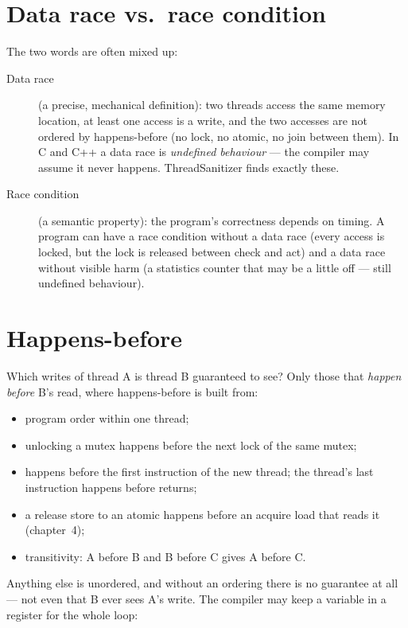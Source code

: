 \section{Data race vs.\ race condition}

The two words are often mixed up:

\begin{description}
  \item[Data race] (a precise, mechanical definition): two threads access
    the same memory location, at least one access is a write, and the two
    accesses are not ordered by happens-before (no lock, no atomic, no
    join between them). In C and C++ a data race is \emph{undefined
    behaviour} --- the compiler may assume it never happens.
    ThreadSanitizer finds exactly these.
  \item[Race condition] (a semantic property): the program's correctness
    depends on timing. A program can have a race condition without a data
    race (every access is locked, but the lock is released between check
    and act) and a data race without visible harm (a statistics counter
    that may be a little off --- still undefined behaviour).
\end{description}

\section{Happens-before}

Which writes of thread A is thread B guaranteed to see? Only those that
\emph{happen before} B's read, where happens-before is built from:

\begin{itemize}
  \item program order within one thread;
  \item unlocking a mutex happens before the next lock of the same mutex;
  \item {} happens before the first instruction of the
    new thread; the thread's last instruction happens before
     returns;
  \item a release store to an atomic happens before an acquire load that
    reads it (chapter~4);
  \item transitivity: A before B and B before C gives A before C.
\end{itemize}

Anything else is unordered, and without an ordering there is no
guarantee at all --- not even that B ever sees A's write. The compiler
may keep a variable in a register for the whole loop:


